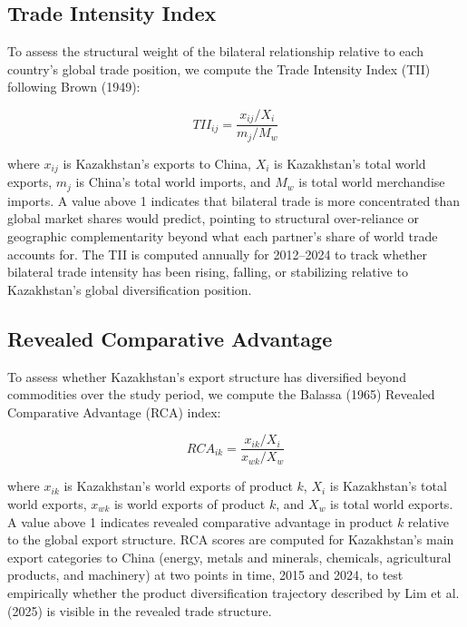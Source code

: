 \documentclass[12pt]{article}
\begin{document}
\subsection{Trade Intensity Index}

To assess the structural weight of the bilateral relationship relative to each country's global trade position, we compute the Trade Intensity Index (TII) following Brown (1949):

\begin{equation}
TII_{ij} = \frac{x_{ij} / X_i}{m_j / M_w}
\end{equation}

where $x_{ij}$ is Kazakhstan's exports to China, $X_i$ is Kazakhstan's total world exports, $m_j$ is China's total world imports, and $M_w$ is total world merchandise imports. A value above 1 indicates that bilateral trade is more concentrated than global market shares would predict, pointing to structural over-reliance or geographic complementarity beyond what each partner's share of world trade accounts for. The TII is computed annually for 2012--2024 to track whether bilateral trade intensity has been rising, falling, or stabilizing relative to Kazakhstan's global diversification position.

\subsection{Revealed Comparative Advantage}

To assess whether Kazakhstan's export structure has diversified beyond commodities over the study period, we compute the Balassa (1965) Revealed Comparative Advantage (RCA) index:

\begin{equation}
RCA_{ik} = \frac{x_{ik} / X_i}{x_{wk} / X_w}
\end{equation}

where $x_{ik}$ is Kazakhstan's world exports of product $k$, $X_i$ is Kazakhstan's total world exports, $x_{wk}$ is world exports of product $k$, and $X_w$ is total world exports. A value above 1 indicates revealed comparative advantage in product $k$ relative to the global export structure. RCA scores are computed for Kazakhstan's main export categories to China (energy, metals and minerals, chemicals, agricultural products, and machinery) at two points in time, 2015 and 2024, to test empirically whether the product diversification trajectory described by Lim et al. (2025) is visible in the revealed trade structure.
\end{document}
